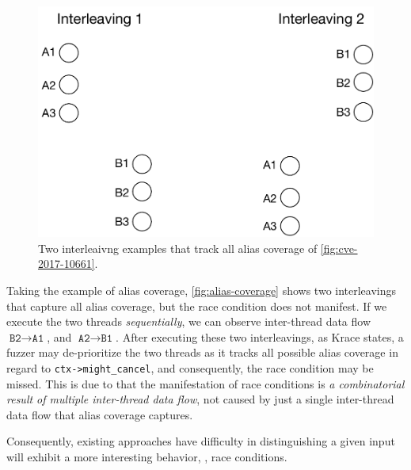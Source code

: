 \begin{figure}
  \centering
  \includegraphics[width=0.9\linewidth]{fig/alias-coverage.pdf}
  \caption{Two interleaivng examples that track all alias coverage of
    \autoref{fig:cve-2017-10661}.}
  \label{fig:alias-coverage}
\end{figure}

%
Taking the example of alias coverage, \autoref{fig:alias-coverage}
shows two interleavings that capture all alias coverage, but the race
condition does not manifest.
%
If we execute the two threads \textit{sequentially}, we can observe
inter-thread data flow $\texttt{B2} \rightarrow \texttt{A1}$, and
$\texttt{A2} \rightarrow \texttt{B1}$.
%
After executing these two interleavings, as Krace states, a fuzzer may
de-prioritize the two threads as it tracks all possible alias coverage
in regard to \texttt{ctx->might_cancel}, and consequently, the race
condition may be missed.
%
This is due to that the manifestation of race conditions is \textit{a
  combinatorial result of multiple inter-thread data flow}, not caused
by just a single inter-thread data flow that alias coverage captures.

Consequently, existing approaches have
difficulty in distinguishing a given input will exhibit a more
interesting behavior, \ie, race conditions.


